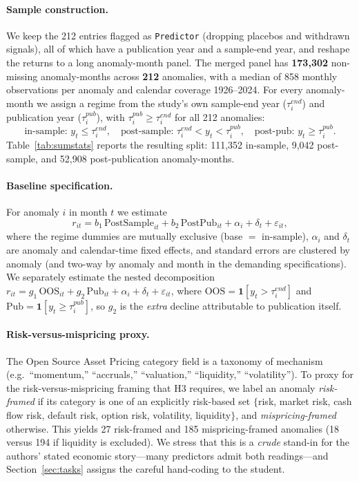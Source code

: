 \documentclass[12pt]{article}
\begin{document}
\paragraph{Sample construction.} We keep the 212 entries flagged as \texttt{Predictor}
(dropping placebos and withdrawn signals), all of which have a publication year and a
sample-end year, and reshape the returns to a long anomaly-month panel. The merged panel has
\textbf{173{,}302} non-missing anomaly-months across \textbf{212} anomalies, with a median of
858 monthly observations per anomaly and calendar coverage 1926--2024. For every anomaly-month
we assign a regime from the study's own sample-end year ($\tau^{end}_i$) and publication year
($\tau^{pub}_i$), with $\tau^{pub}_i \ge \tau^{end}_i$ for all 212 anomalies:
\[
\text{in-sample: } y_t \le \tau^{end}_i, \quad
\text{post-sample: } \tau^{end}_i < y_t < \tau^{pub}_i, \quad
\text{post-pub: } y_t \ge \tau^{pub}_i .
\]
Table~\ref{tab:sumstats} reports the resulting split: 111{,}352 in-sample, 9{,}042
post-sample, and 52{,}908 post-publication anomaly-months.

\paragraph{Baseline specification.} For anomaly $i$ in month $t$ we estimate
\begin{equation}
r_{it} = b_1\,\text{PostSample}_{it} + b_2\,\text{PostPub}_{it} + \alpha_i + \delta_t + \varepsilon_{it},
\label{eq:main}
\end{equation}
where the regime dummies are mutually exclusive (base $=$ in-sample), $\alpha_i$ and $\delta_t$
are anomaly and calendar-time fixed effects, and standard errors are clustered by anomaly (and
two-way by anomaly and month in the demanding specifications). We separately estimate the nested
\citet{mcleanpontiff2016} decomposition $r_{it}=g_1\,\text{OOS}_{it}+g_2\,\text{Pub}_{it}
+\alpha_i+\delta_t+\varepsilon_{it}$, where $\text{OOS}=\mathbf{1}[y_t>\tau^{end}_i]$ and
$\text{Pub}=\mathbf{1}[y_t\ge\tau^{pub}_i]$, so $g_2$ is the \emph{extra} decline attributable
to publication itself.

\paragraph{Risk-versus-mispricing proxy.} The Open Source Asset Pricing category field is a
taxonomy of mechanism (e.g.\ ``momentum,'' ``accruals,'' ``valuation,'' ``liquidity,''
``volatility''). To proxy for the risk-versus-mispricing framing that H3 requires, we label an
anomaly \emph{risk-framed} if its category is one of an explicitly risk-based set
$\{$risk, market risk, cash flow risk, default risk, option risk, volatility, liquidity$\}$,
and \emph{mispricing-framed} otherwise. This yields 27 risk-framed and 185 mispricing-framed
anomalies (18 versus 194 if liquidity is excluded). We stress that this is a \emph{crude}
stand-in for the authors' stated economic story---many predictors admit both readings---and
Section~\ref{sec:tasks} assigns the careful hand-coding to the student.
\end{document}
